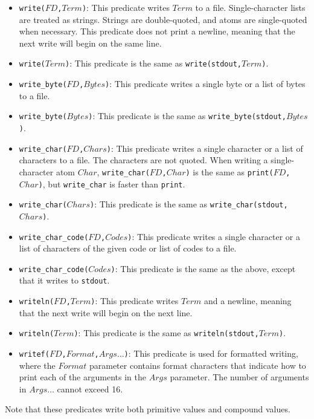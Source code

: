 \begin{itemize}
\item \texttt{write($FD$,$Term$)}: This predicate writes $Term$ to a file.  Single-character lists are treated as strings.  Strings are double-quoted, and atoms are single-quoted when necessary.  This predicate does not print a newline, meaning that the next write will begin on the same line.
\item \texttt{write($Term$)}: This predicate is the same as \texttt{write(stdout,$Term$)}.
\item \texttt{write\_byte($FD$,$Bytes$)}: This predicate writes a single byte or a list of bytes to a file.
\item \texttt{write\_byte($Bytes$)}: This predicate is the same as \texttt{write\_byte(stdout,$Bytes$)}.
\item \texttt{write\_char($FD$,$Chars$)}: This predicate writes a single character or a list of characters to a file. The characters are not quoted. When writing a single-character atom $Char$, \texttt{write\_char($FD$,$Char$)} is the same as \texttt{print($FD$,$Char$)}, but \texttt{write\_char} is faster than \texttt{print}.
\item \texttt{write\_char($Chars$)}: This predicate is the same as \texttt{write\_char(stdout,$Chars$)}.
\item \texttt{write\_char\_code($FD$,$Codes$)}: This predicate writes a single character or a list of characters of the given code or list of codes to a file.
\item \texttt{write\_char\_code($Codes$)}: This predicate is the same as the above, except that it writes to \texttt{stdout}.

\item \texttt{writeln($FD$,$Term$)}: This predicate writes $Term$ and a newline, meaning that the next write will begin on the next line.
\item \texttt{writeln($Term$)}: This predicate is the same as \texttt{writeln(stdout,$Term$)}.
\item \texttt{writef($FD$,$Format$,$Args\ldots$)}: This predicate is used for formatted writing, where the $Format$ parameter contains format characters that indicate how to print each of the arguments in the $Args$ parameter. The number of arguments in $Args\ldots$ cannot exceed 16.
\end{itemize}
Note that these predicates write both primitive values and compound values.

